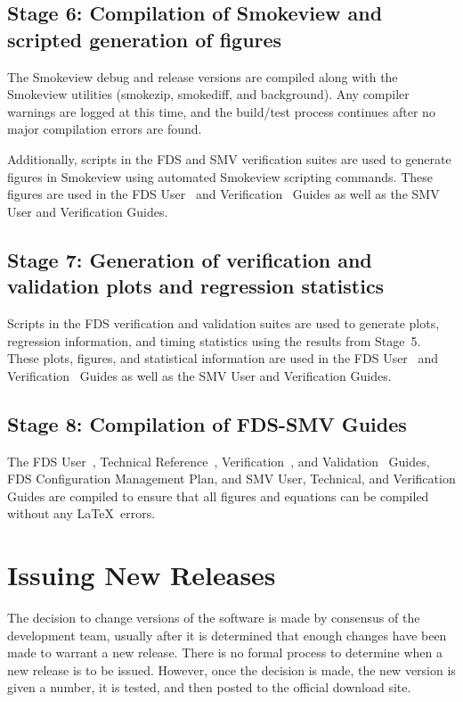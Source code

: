 \documentclass[11pt]{book}
\begin{document}
\subsection*{Stage 6: Compilation of Smokeview and scripted generation of figures}

The Smokeview debug and release versions are compiled along with the Smokeview utilities (smokezip, smokediff, and background). Any compiler warnings are logged at this time, and the build/test process continues after no major compilation errors are found.

Additionally, scripts in the FDS and SMV verification suites are used to generate figures in Smokeview using automated Smokeview scripting commands. These figures are used in the FDS User~\cite{FDS_Users_Guide} and Verification~\cite{FDS_Verification_Guide} Guides as well as the SMV User and Verification Guides.

\subsection*{Stage 7: Generation of verification and validation plots and regression statistics}

Scripts in the FDS verification and validation suites are used to generate plots, regression information, and timing statistics using the results from Stage~5. These plots, figures, and statistical information are used in the FDS User~\cite{FDS_Users_Guide} and Verification~\cite{FDS_Verification_Guide} Guides as well as the SMV User and Verification Guides.

\subsection*{Stage 8: Compilation of FDS-SMV Guides}

The FDS User~\cite{FDS_Users_Guide}, Technical Reference~\cite{FDS_Math_Guide}, Verification~\cite{FDS_Verification_Guide}, and Validation~\cite{FDS_Validation_Guide} Guides, FDS Configuration Management Plan, and SMV User, Technical, and Verification Guides are compiled to ensure that all figures and equations can be compiled without any \LaTeX\ errors.

\clearpage

\section{Issuing New Releases}

The decision to change versions of the software is made by consensus of the development team, usually after it is determined that enough
changes have been made to warrant a new release. There is no formal process to determine when a new release is to be issued. However, once the
decision is made, the new version is given a number, it is tested, and then posted to the official download site.
\end{document}
